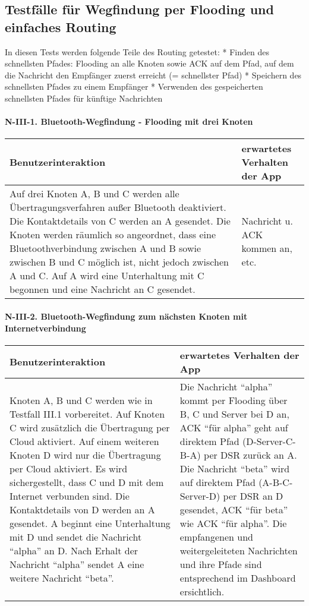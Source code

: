 
\clearpage
\subsection{Testfälle für Wegfindung per Flooding und einfaches
Routing}\label{iii-testfuxe4lle-fuxfcr-wegfindung-per-flooding-und-einfaches-routing}

In diesen Tests werden folgende Teile des Routing getestet: * Finden des
schnellsten Pfades: Flooding an alle Knoten sowie ACK auf dem Pfad, auf
dem die Nachricht den Empfänger zuerst erreicht (= schnellster Pfad) *
Speichern des schnellsten Pfades zu einem Empfänger * Verwenden des
gespeicherten schnellsten Pfades für künftige Nachrichten

\paragraph{N-III-1. Bluetooth-Wegfindung - Flooding mit drei
Knoten}\label{bluetooth-wegfindung---flooding-mit-drei-knoten}

\begin{longtable}{p{8cm}p{8.5cm}}
\toprule
Benutzerinteraktion & erwartetes Verhalten der App\tabularnewline
\midrule
\endhead
Auf drei Knoten A, B und C werden alle Übertragungsverfahren außer
Bluetooth deaktiviert. Die Kontaktdetails von C werden an A gesendet.
Die Knoten werden räumlich so angeordnet, dass eine Bluetoothverbindung
zwischen A und B sowie zwischen B und C möglich ist, nicht jedoch
zwischen A und C. Auf A wird eine Unterhaltung mit C begonnen und eine
Nachricht an C gesendet. & Nachricht u. ACK kommen an,
etc.\tabularnewline
\bottomrule
\end{longtable}

\paragraph{N-III-2. Bluetooth-Wegfindung zum nächsten Knoten mit
Internetverbindung}\label{bluetooth-wegfindung-zum-nuxe4chsten-knoten-mit-internetverbindung}

\begin{longtable}{p{8cm}p{8.5cm}}
\toprule
Benutzerinteraktion & erwartetes Verhalten der App\tabularnewline
\midrule
\endhead
Knoten A, B und C werden wie in Testfall III.1 vorbereitet. Auf Knoten C
wird zusätzlich die Übertragung per Cloud aktiviert. Auf einem weiteren
Knoten D wird nur die Übertragung per Cloud aktiviert. Es wird
sichergestellt, dass C und D mit dem Internet verbunden sind. Die
Kontaktdetails von D werden an A gesendet. A beginnt eine Unterhaltung
mit D und sendet die Nachricht ``alpha'' an D. Nach Erhalt der Nachricht
``alpha'' sendet A eine weitere Nachricht ``beta''. & Die Nachricht
``alpha'' kommt per Flooding über B, C und Server bei D an, ACK ``für
alpha'' geht auf direktem Pfad (D-Server-C-B-A) per DSR zurück an A. Die
Nachricht ``beta'' wird auf direktem Pfad (A-B-C-Server-D) per DSR an D
gesendet, ACK ``für beta'' wie ACK ``für alpha''. Die empfangenen und
weitergeleiteten Nachrichten und ihre Pfade sind entsprechend im
Dashboard ersichtlich.\tabularnewline
\bottomrule
\end{longtable}

